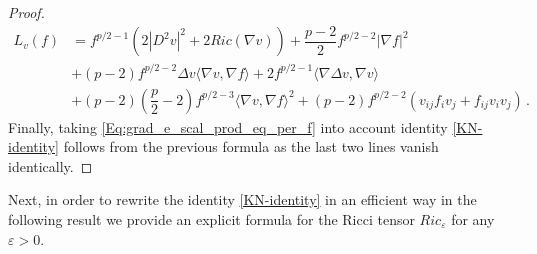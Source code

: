 \documentclass[10pt]{amsart}
\numberwithin{equation}{section}
\theoremstyle{definition}
\begin{document}
\begin{proof}
\begin{equation*}
\begin{aligned}
L_{v}(f) &= f^{p/2-1}\left(2|D^2 v |^2  +2 Ric (\nabla v) \right) 
+\dfrac{p-2}{2} f^{p/2-2}|\nabla f|^2 \\
&+  (p-2)f^{p/2-2}\Delta v \langle \nabla v, \nabla f\rangle + 2f^{p/2-1}\langle\nabla\Delta v,\nabla v\rangle\\
&+(p-2)\left(\dfrac{p}{2}-2\right) f^{p/2-3}\langle \nabla v,\nabla f\rangle^2+(p-2) f^{p/2-2}(v_{ij}f_i v_j + f_{ij}v_i v_j) \, .
\end{aligned}
\end{equation*}
\noindent Finally, taking \eqref{Eq:grad_e_scal_prod_eq_per_f} into account identity \eqref{KN-identity} follows from the previous formula as the last two lines vanish identically.
\end{proof}
Next, in order to rewrite the identity \eqref{KN-identity} in an efficient way in the following result we provide an explicit formula for the Ricci tensor $Ric_{\varepsilon}$ for any $\varepsilon>0$.
\end{document}
